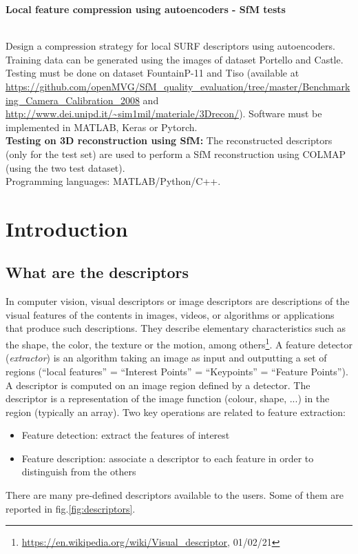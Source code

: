 
{\raggedright\large\textbf{Local feature compression using autoencoders - SfM tests}}\smallskip \\ 
Design a compression strategy for local SURF descriptors using autoencoders. Training data can be generated using the images of dataset Portello and Castle. Testing must be done on dataset FountainP-11 and Tiso (available at \url{https://github.com/openMVG/SfM_quality_evaluation/tree/master/Benchmarking_Camera_Calibration_2008} and \url{http://www.dei.unipd.it/~sim1mil/materiale/3Drecon/}). Software must be implemented in MATLAB, Keras or Pytorch. \\ \textbf{Testing on 3D reconstruction using SfM:} The reconstructed descriptors (only for the test set) are used to perform a SfM reconstruction using COLMAP (using the two test dataset). \\
Programming languages: MATLAB/Python/C++.

\section{Introduction}

\subsection{What are the descriptors}
In computer vision, visual descriptors or image descriptors are descriptions of the visual features of the contents in images, videos, or algorithms or applications that produce such descriptions. They describe elementary characteristics such as the shape, the color, the texture or the motion, among others\footnote{\url{https://en.wikipedia.org/wiki/Visual_descriptor}, 01/02/21}. A feature detector (\emph{extractor}) is an algorithm taking an image as input and outputting a set of regions (``local features'' = ``Interest Points'' = ``Keypoints'' = ``Feature Points''). A descriptor is computed on an image region defined by a detector. The descriptor is a representation of the image function (colour, shape, ...) in the region (typically an array). Two key operations are related to feature extraction:
\begin{itemize}
\item Feature detection: extract the features of interest
\item Feature description: associate a descriptor to each feature in order to distinguish from the others
\end{itemize}
There are many pre-defined descriptors available to the users. Some of them are reported in fig.\ref{fig:descriptors}.

